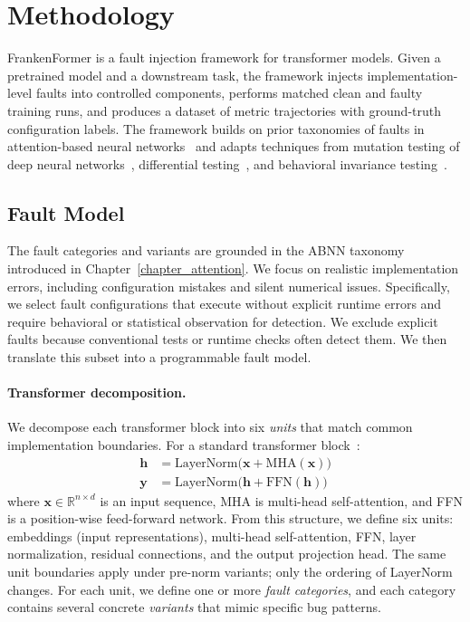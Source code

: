 \section{Methodology}
\label{sec:frankenformer-methodology}

FrankenFormer is a fault injection framework for transformer models. Given a pretrained model and a downstream task, the framework injects implementation-level faults into controlled components, performs matched clean and faulty training runs, and produces a dataset of metric trajectories with ground-truth configuration labels.
The framework builds on prior taxonomies of faults in attention-based neural networks~\citep{ABNN_sigma} and adapts techniques from mutation testing of deep neural networks~\citep{deepmutation++,deepcrime,deepmutation}, differential testing~\citep{Tian2017}, and behavioral invariance testing~\citep{chen2018metamorphic,ribeiro2020checklist}.

\subsection{Fault Model}
\label{subsec:fault-model}

The fault categories and variants are grounded in the ABNN taxonomy introduced in Chapter~\ref{chapter_attention}. We focus on realistic implementation errors, including configuration mistakes and silent numerical issues. Specifically, we select fault configurations that execute without explicit runtime errors and require behavioral or statistical observation for detection. We exclude explicit faults because conventional tests or runtime checks often detect them. We then translate this subset into a programmable fault model.

\paragraph{Transformer decomposition.}
We decompose each transformer block into six \emph{units} that match common implementation boundaries. For a standard transformer block~\citep{vaswani2017attention}:
\begin{align}
\mathbf{h} &= \mathrm{LayerNorm}\bigl(\mathbf{x} + \mathrm{MHA}(\mathbf{x})\bigr) \label{eq:attn-block}\\
\mathbf{y} &= \mathrm{LayerNorm}\bigl(\mathbf{h} + \mathrm{FFN}(\mathbf{h})\bigr) \label{eq:ffn-block}
\end{align}
where $\mathbf{x} \in \mathbb{R}^{n \times d}$ is an input sequence, MHA is multi-head self-attention, and FFN is a position-wise feed-forward network.
From this structure, we define six units: embeddings (input representations), multi-head self-attention, FFN, layer normalization, residual connections, and the output projection head.
The same unit boundaries apply under pre-norm variants; only the ordering of LayerNorm changes.
For each unit, we define one or more \emph{fault categories}, and each category contains several concrete \emph{variants} that mimic specific bug patterns.

